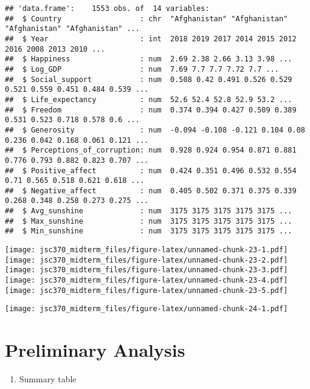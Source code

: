 \documentclass[
]{article}
\providecommand{\tightlist}{%
  \setlength{\itemsep}{0pt}\setlength{\parskip}{0pt}}
\begin{document}
\begin{verbatim}
## 'data.frame':    1553 obs. of  14 variables:
##  $ Country                  : chr  "Afghanistan" "Afghanistan" "Afghanistan" "Afghanistan" ...
##  $ Year                     : int  2018 2019 2017 2014 2015 2012 2016 2008 2013 2010 ...
##  $ Happiness                : num  2.69 2.38 2.66 3.13 3.98 ...
##  $ Log_GDP                  : num  7.69 7.7 7.7 7.72 7.7 ...
##  $ Social_support           : num  0.508 0.42 0.491 0.526 0.529 0.521 0.559 0.451 0.484 0.539 ...
##  $ Life_expectancy          : num  52.6 52.4 52.8 52.9 53.2 ...
##  $ Freedom                  : num  0.374 0.394 0.427 0.509 0.389 0.531 0.523 0.718 0.578 0.6 ...
##  $ Generosity               : num  -0.094 -0.108 -0.121 0.104 0.08 0.236 0.042 0.168 0.061 0.121 ...
##  $ Perceptions_of_corruption: num  0.928 0.924 0.954 0.871 0.881 0.776 0.793 0.882 0.823 0.707 ...
##  $ Positive_affect          : num  0.424 0.351 0.496 0.532 0.554 0.71 0.565 0.518 0.621 0.618 ...
##  $ Negative_affect          : num  0.405 0.502 0.371 0.375 0.339 0.268 0.348 0.258 0.273 0.275 ...
##  $ Avg_sunshine             : num  3175 3175 3175 3175 3175 ...
##  $ Max_sunshine             : num  3175 3175 3175 3175 3175 ...
##  $ Min_sunshine             : num  3175 3175 3175 3175 3175 ...
\end{verbatim}

\texttt{[image: jsc370\_midterm\_files/figure-latex/unnamed-chunk-23-1.pdf]}
\texttt{[image: jsc370\_midterm\_files/figure-latex/unnamed-chunk-23-2.pdf]}
\texttt{[image: jsc370\_midterm\_files/figure-latex/unnamed-chunk-23-3.pdf]}
\texttt{[image: jsc370\_midterm\_files/figure-latex/unnamed-chunk-23-4.pdf]}
\texttt{[image: jsc370\_midterm\_files/figure-latex/unnamed-chunk-23-5.pdf]}

\texttt{[image: jsc370\_midterm\_files/figure-latex/unnamed-chunk-24-1.pdf]}

\hypertarget{preliminary-analysis}{%
\section{Preliminary Analysis}\label{preliminary-analysis}}

\begin{enumerate}
\def\labelenumi{\arabic{enumi}.}
\setcounter{enumi}{-1}
\tightlist
\item
  Summary table
\end{enumerate}
\end{document}
